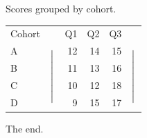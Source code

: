 \documentclass{article}
\begin{document}
Scores grouped by cohort.

\begin{tabular}{l c r r r c}
Cohort & & Q1 & Q2 & Q3 & \\
A & \multirow{4}{*}{$\left|\rule{0pt}{30pt}\right.$} & 12 & 14 & 15 & \multirow{4}{*}{$\left|\rule{0pt}{30pt}\right.$}\\
B & & 11 & 13 & 16 & \\
C & & 10 & 12 & 18 & \\
D & & 9 & 15 & 17 & \\
\end{tabular}

The end.
\end{document}
